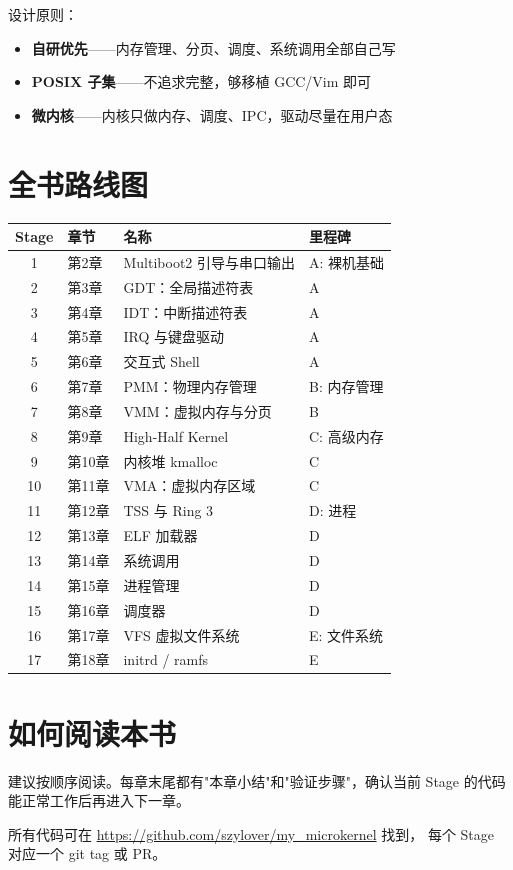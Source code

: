 设计原则：
\begin{itemize}
  \item \textbf{自研优先}——内存管理、分页、调度、系统调用全部自己写
  \item \textbf{POSIX 子集}——不追求完整，够移植 GCC/Vim 即可
  \item \textbf{微内核}——内核只做内存、调度、IPC，驱动尽量在用户态
\end{itemize}

\section{全书路线图}

\begin{longtable}{clll}
  \toprule
  \textbf{Stage} & \textbf{章节} & \textbf{名称} & \textbf{里程碑} \\
  \midrule
  \endhead
  1  & 第2章  & Multiboot2 引导与串口输出  & A: 裸机基础 \\
  2  & 第3章  & GDT：全局描述符表          & A \\
  3  & 第4章  & IDT：中断描述符表          & A \\
  4  & 第5章  & IRQ 与键盘驱动             & A \\
  5  & 第6章  & 交互式 Shell               & A \\
  6  & 第7章  & PMM：物理内存管理          & B: 内存管理 \\
  7  & 第8章  & VMM：虚拟内存与分页        & B \\
  8  & 第9章  & High-Half Kernel           & C: 高级内存 \\
  9  & 第10章 & 内核堆 kmalloc             & C \\
  10 & 第11章 & VMA：虚拟内存区域          & C \\
  11 & 第12章 & TSS 与 Ring 3              & D: 进程 \\
  12 & 第13章 & ELF 加载器                 & D \\
  13 & 第14章 & 系统调用                   & D \\
  14 & 第15章 & 进程管理                   & D \\
  15 & 第16章 & 调度器                     & D \\
  16 & 第17章 & VFS 虚拟文件系统           & E: 文件系统 \\
  17 & 第18章 & initrd / ramfs             & E \\
  \bottomrule
\end{longtable}

\section{如何阅读本书}

建议按顺序阅读。每章末尾都有"本章小结"和"验证步骤"，确认当前 Stage
的代码能正常工作后再进入下一章。

所有代码可在 \url{https://github.com/szylover/my_microkernel} 找到，
每个 Stage 对应一个 git tag 或 PR。
